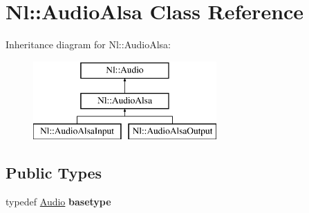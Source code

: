 \hypertarget{classNl_1_1AudioAlsa}{}\section{Nl\+:\+:Audio\+Alsa Class Reference}
\label{classNl_1_1AudioAlsa}
Inheritance diagram for Nl\+:\+:Audio\+Alsa\+:\begin{figure}[H]
\begin{center}
\leavevmode
\includegraphics[height=3.000000cm]{classNl_1_1AudioAlsa}
\end{center}
\end{figure}
\subsection*{Public Types}
\begin{DoxyCompactItemize}
\item 
\hypertarget{classNl_1_1AudioAlsa_aad72327bf2bb040c59788d54992510fe}{}typedef \hyperlink{classNl_1_1Audio}{Audio} {\bfseries basetype}\label{classNl_1_1AudioAlsa_aad72327bf2bb040c59788d54992510fe}

\end{DoxyCompactItemize}
